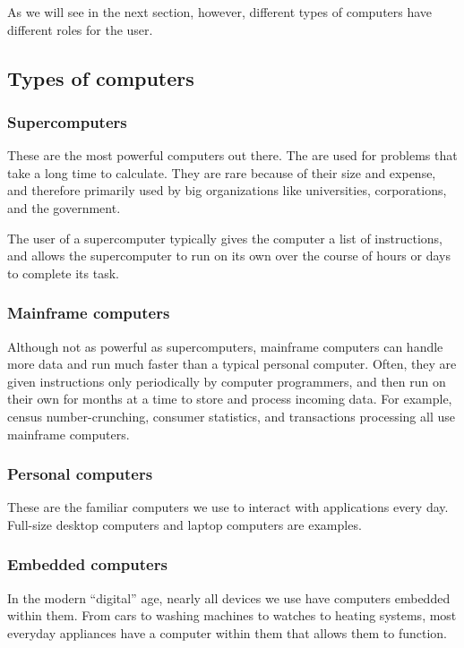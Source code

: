 \documentclass[letterpaper,10pt,english,openany,oneside]{sphinxmanual}
\begin{document}
As we will see in the next section, however, different types of computers have different roles for the user.


\subsection{Types of computers}
\label{\detokenize{introduction:types-of-computers}}

\subsubsection{Supercomputers}
\label{\detokenize{introduction:supercomputers}}
These are the most powerful computers out there. The are used for problems that take a long time to calculate. They are rare because of their size and expense, and therefore primarily used by big organizations like universities, corporations, and the government.

The user of a supercomputer typically gives the computer a list of instructions, and allows the supercomputer to run on its own over the course of hours or days to complete its task.


\subsubsection{Mainframe computers}
\label{\detokenize{introduction:mainframe-computers}}
Although not as powerful as supercomputers, mainframe computers can handle more data and run much faster than a typical personal computer. Often, they are given instructions only periodically by computer programmers, and then run on their own for months at a time to store and process incoming data. For example, census number-crunching, consumer statistics, and transactions processing all use mainframe computers.


\subsubsection{Personal computers}
\label{\detokenize{introduction:personal-computers}}
These are the familiar computers we use to interact with applications every day. Full-size desktop computers and laptop computers are examples.


\subsubsection{Embedded computers}
\label{\detokenize{introduction:embedded-computers}}
In the modern “digital” age, nearly all devices we use have computers embedded within them. From cars to washing machines to watches to heating systems, most everyday appliances have a computer within them that allows them to function.
\end{document}
